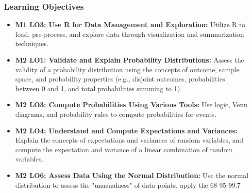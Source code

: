 \begin{frame}
    \frametitle{Learning Objectives}
    \begin{itemize}
        \item \textbf{M1 LO3: Use R for Data Management and Exploration:} Utilize R to load, pre-process, and explore data through visualization and summarization techniques.
        \item \textbf{M2 LO1: Validate and Explain Probability Distributions:} Assess the validity of a probability distribution using the concepts of outcome, sample space, and probability properties (e.g., disjoint outcomes, probabilities between 0 and 1, and total probabilities summing to 1).
        \item \textbf{M2 LO3: Compute Probabilities Using Various Tools:} Use logic, Venn diagrams, and probability rules to compute probabilities for events.
        \item \textbf{M2 LO4: Understand and Compute Expectations and Variances:} Explain the concepts of expectations and variances of random variables, and compute the expectation and variance of a linear combination of random variables.
        \item \textbf{M2 LO6: Assess Data Using the Normal Distribution:} Use the normal distribution to assess the "unusualness" of data points, apply the 68-95-99.7%
    \end{itemize}
\end{frame}

